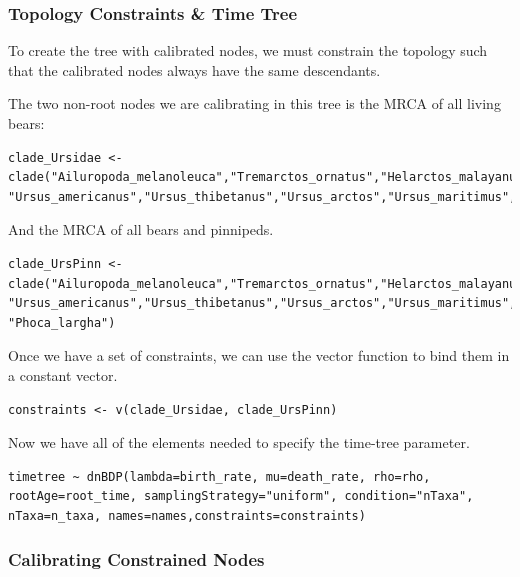 \subsubsection{Topology Constraints \& Time Tree}

To create the tree with calibrated nodes, we must constrain the topology such that the calibrated nodes always have the same descendants.

The two non-root nodes we are calibrating in this tree is the MRCA of all living bears:
{\tt \begin{snugshade*}
\begin{lstlisting}
clade_Ursidae <- clade("Ailuropoda_melanoleuca","Tremarctos_ornatus","Helarctos_malayanus", "Ursus_americanus","Ursus_thibetanus","Ursus_arctos","Ursus_maritimus","Melursus_ursinus")
\end{lstlisting}
\end{snugshade*}}

And the MRCA of all bears and pinnipeds. 
{\tt \begin{snugshade*}
\begin{lstlisting}
clade_UrsPinn <- clade("Ailuropoda_melanoleuca","Tremarctos_ornatus","Helarctos_malayanus", "Ursus_americanus","Ursus_thibetanus","Ursus_arctos","Ursus_maritimus","Melursus_ursinus", "Phoca_largha")
\end{lstlisting}
\end{snugshade*}}

Once we have a set of constraints, we can use the vector function  to bind them in a constant vector.
{\tt \begin{snugshade*}
\begin{lstlisting}
constraints <- v(clade_Ursidae, clade_UrsPinn)
\end{lstlisting}
\end{snugshade*}}

Now we have all of the elements needed to specify the time-tree parameter.
{\tt \begin{snugshade*}
\begin{lstlisting}
timetree ~ dnBDP(lambda=birth_rate, mu=death_rate, rho=rho, rootAge=root_time, samplingStrategy="uniform", condition="nTaxa", nTaxa=n_taxa, names=names,constraints=constraints)
\end{lstlisting}
\end{snugshade*}}


\subsubsection{Calibrating Constrained Nodes}


